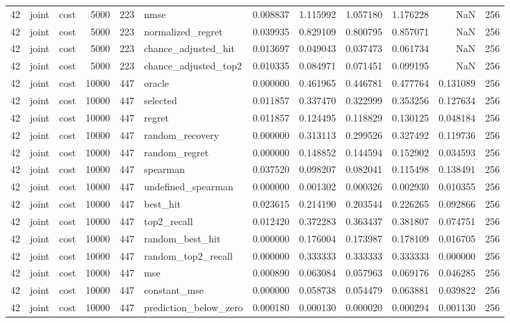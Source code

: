 \begin{tabular}{rllrrlrrrrrr}
42 & joint & cost & 5000 & 223 & nmse & 0.008837 & 1.115992 & 1.057180 & 1.176228 & NaN & 256 \\
42 & joint & cost & 5000 & 223 & normalized_regret & 0.039935 & 0.829109 & 0.800795 & 0.857071 & NaN & 256 \\
42 & joint & cost & 5000 & 223 & chance_adjusted_hit & 0.013697 & 0.049043 & 0.037473 & 0.061734 & NaN & 256 \\
42 & joint & cost & 5000 & 223 & chance_adjusted_top2 & 0.010335 & 0.084971 & 0.071451 & 0.099195 & NaN & 256 \\
42 & joint & cost & 10000 & 447 & oracle & 0.000000 & 0.461965 & 0.446781 & 0.477764 & 0.131089 & 256 \\
42 & joint & cost & 10000 & 447 & selected & 0.011857 & 0.337470 & 0.322999 & 0.353256 & 0.127634 & 256 \\
42 & joint & cost & 10000 & 447 & regret & 0.011857 & 0.124495 & 0.118829 & 0.130125 & 0.048184 & 256 \\
42 & joint & cost & 10000 & 447 & random_recovery & 0.000000 & 0.313113 & 0.299526 & 0.327492 & 0.119736 & 256 \\
42 & joint & cost & 10000 & 447 & random_regret & 0.000000 & 0.148852 & 0.144594 & 0.152902 & 0.034593 & 256 \\
42 & joint & cost & 10000 & 447 & spearman & 0.037520 & 0.098207 & 0.082041 & 0.115498 & 0.138491 & 256 \\
42 & joint & cost & 10000 & 447 & undefined_spearman & 0.000000 & 0.001302 & 0.000326 & 0.002930 & 0.010355 & 256 \\
42 & joint & cost & 10000 & 447 & best_hit & 0.023615 & 0.214190 & 0.203544 & 0.226265 & 0.092866 & 256 \\
42 & joint & cost & 10000 & 447 & top2_recall & 0.012420 & 0.372283 & 0.363437 & 0.381807 & 0.074751 & 256 \\
42 & joint & cost & 10000 & 447 & random_best_hit & 0.000000 & 0.176004 & 0.173987 & 0.178109 & 0.016705 & 256 \\
42 & joint & cost & 10000 & 447 & random_top2_recall & 0.000000 & 0.333333 & 0.333333 & 0.333333 & 0.000000 & 256 \\
42 & joint & cost & 10000 & 447 & mse & 0.000890 & 0.063084 & 0.057963 & 0.069176 & 0.046285 & 256 \\
42 & joint & cost & 10000 & 447 & constant_mse & 0.000000 & 0.058738 & 0.054479 & 0.063881 & 0.039822 & 256 \\
42 & joint & cost & 10000 & 447 & prediction_below_zero & 0.000180 & 0.000130 & 0.000020 & 0.000294 & 0.001130 & 256 \\

\end{tabular}
